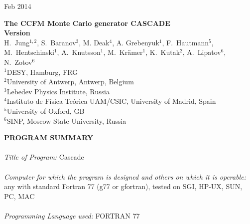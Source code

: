 \documentclass[11pt]{article} \usepackage{mystyle-new}
\newcommand{\cascadeversion}{~}
\def\CASCADE{{\sc Cascade}}
\begin{document}
%
\begin{flushright}
 Feb 2014
\end{flushright}
\begin{center} {\sffamily\Large\bfseries 
The CCFM Monte Carlo generator CASCADE \\ \vspace*{0.15cm}
Version\cascadeversion\ }
 \\ \vspace{0.5cm}
{ \Large H.~Jung$^{1,2}$,
S.~Baranov$^3$, M. Deak$^4$, A. Grebenyuk$^1$, F.~Hautmann$^5$,
M.~Hentschinski$^1$,  A.~Knutsson$^1$, M.~Kr\"amer$^1$, K.~Kutak$^2$, A.~Lipatov$^6$, N.~Zotov$^6$ }\\
      {\large $^1$DESY, Hamburg, FRG}\\
     {\large $^2$University of Antwerp, Antwerp, Belgium}\\
   {\large $^3 $Lebedev Physics Institute, Russia }\\
    {\large $^4$Instituto de F\'isica Te\'orica UAM/CSIC, University of Madrid, Spain }\\
    {\large $^5$University of Oxford, GB}\\
    {\large $^6$SINP, Moscow State University, Russia }
\end{center}
\begin{abstract}
\CASCADE\ is a full hadron level Monte Carlo event generator for $ep$, 
$\gamma p$ and $p\bar{p}$ and $pp$ processes,
 which uses the
CCFM evolution equation for the initial state cascade in a backward evolution
approach supplemented 
with off - shell matrix elements for the hard scattering.
A detailed program description is given, with emphasis on parameters
the user wants to change and common block variables which 
completely specify the generated events.
\end{abstract} 
{\sffamily\large\bfseries PROGRAM SUMMARY} \\ \\
{\em Title of Program:} \CASCADE\ \cascadeversion\ \\ \\
{\em Computer for which the program is designed and others on which it is
operable:}   any with standard Fortran 77 (g77 or gfortran), tested on 
                 SGI, HP-UX, SUN, PC, MAC\\ \\
{\em Programming Language used:}  FORTRAN 77 \\ \\
\end{document}
